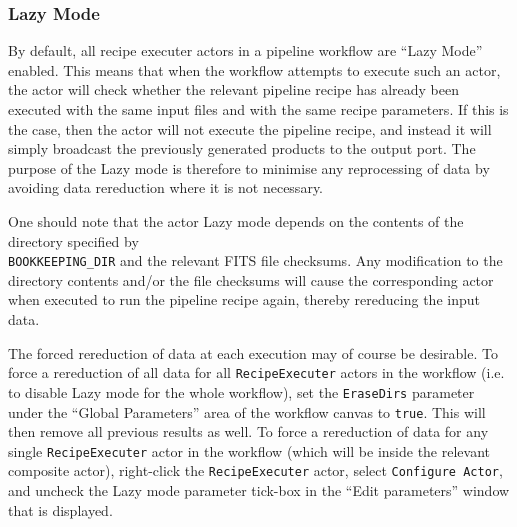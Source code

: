 \subsubsection{Lazy Mode \label{sec:lazy_mode}}

By default, all recipe executer actors in a pipeline workflow are
``Lazy Mode'' enabled. This means that when the workflow attempts to
execute such an actor, the actor will check whether the relevant
pipeline recipe has already been executed with the same input files
and with the same recipe parameters. If this is the case, then the
actor will not execute the pipeline recipe, and instead it will simply
broadcast the previously generated products to the output port. The
purpose of the Lazy mode is therefore to minimise any reprocessing of
data by avoiding data rereduction where it is not necessary.
  
One should note that the actor Lazy mode depends on the contents of
the directory specified by \\ {\tt BOOKKEEPING\_DIR} and the relevant
FITS file checksums. Any modification to the directory contents and/or
the file checksums will cause the corresponding actor when executed to
run the pipeline recipe again, thereby rereducing the input data.

The forced rereduction of data at each execution may of course be
desirable. To force a rereduction of all data for all {\tt RecipeExecuter}
actors in the workflow (i.e. to disable Lazy mode for the whole
workflow), set the {\tt EraseDirs} parameter under the ``Global
Parameters'' area of the workflow canvas to {\tt true}. This will then
remove all previous results as well.  To force a rereduction of data
for any single  {\tt RecipeExecuter} actor in the workflow (which will be
inside the relevant composite actor), right-click the  {\tt RecipeExecuter} actor, select
{\tt Configure Actor}, and uncheck the Lazy mode parameter tick-box in
the ``Edit parameters'' window that is displayed.

